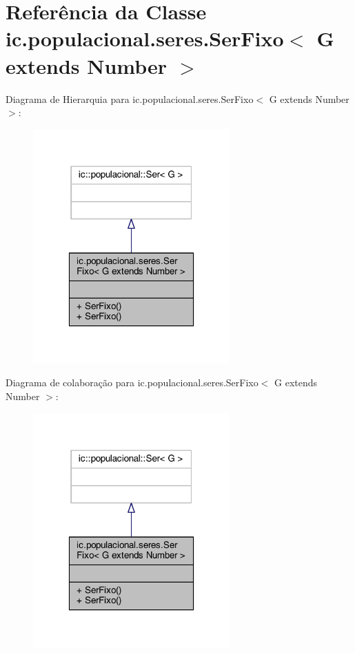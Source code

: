\hypertarget{classic_1_1populacional_1_1seres_1_1_ser_fixo_3_01_g_01extends_01_number_01_4}{\section{Referência da Classe ic.\-populacional.\-seres.\-Ser\-Fixo$<$ G extends Number $>$}
\label{classic_1_1populacional_1_1seres_1_1_ser_fixo_3_01_g_01extends_01_number_01_4}
}


Diagrama de Hierarquia para ic.\-populacional.\-seres.\-Ser\-Fixo$<$ G extends Number $>$\-:\nopagebreak
\begin{figure}[H]
\begin{center}
\leavevmode
\includegraphics[width=214pt]{classic_1_1populacional_1_1seres_1_1_ser_fixo_3_01_g_01extends_01_number_01_4__inherit__graph}
\end{center}
\end{figure}


Diagrama de colaboração para ic.\-populacional.\-seres.\-Ser\-Fixo$<$ G extends Number $>$\-:\nopagebreak
\begin{figure}[H]
\begin{center}
\leavevmode
\includegraphics[width=214pt]{classic_1_1populacional_1_1seres_1_1_ser_fixo_3_01_g_01extends_01_number_01_4__coll__graph}
\end{center}
\end{figure}
